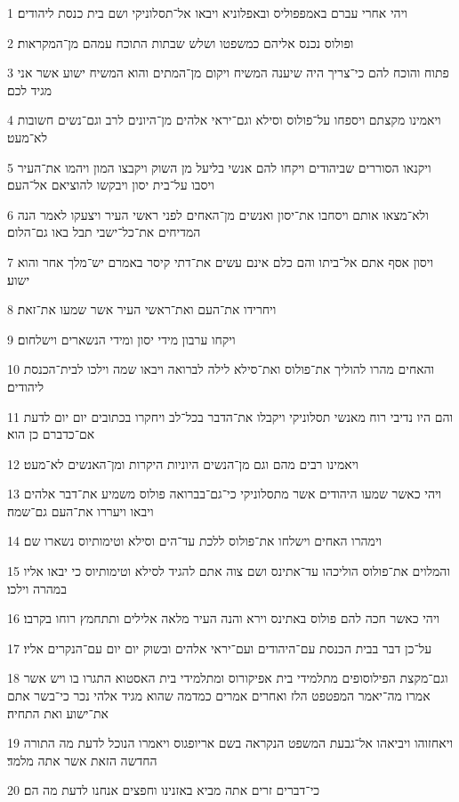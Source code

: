 \par 1 ויהי אחרי עברם באמפפוליס ובאפלוניא ויבאו אל־תסלוניקי ושם בית כנסת ליהודים׃
\par 2 ופולוס נכנס אליהם כמשפטו ושלש שבתות התוכח עמהם מן־המקראות׃
\par 3 פתוח והוכח להם כי־צריך היה שיענה המשיח ויקום מן־המתים והוא המשיח ישוע אשר אני מגיד לכם׃
\par 4 ויאמינו מקצתם ויספחו על־פולוס וסילא וגם־יראי אלהים מן־היונים לרב וגם־נשים חשובות לא־מעט׃
\par 5 ויקנאו הסוררים שביהודים ויקחו להם אנשי בליעל מן השוק ויקבצו המון ויהמו את־העיר ויסבו על־בית יסון ויבקשו להוציאם אל־העם׃
\par 6 ולא־מצאו אותם ויסחבו את־יסון ואנשים מן־האחים לפני ראשי העיר ויצעקו לאמר הנה המדיחים את־כל־ישבי תבל באו גם־הלום׃
\par 7 ויסון אסף אתם אל־ביתו והם כלם אינם עשים את־דתי קיסר באמרם יש־מלך אחר והוא ישוע׃
\par 8 ויחרידו את־העם ואת־ראשי העיר אשר שמעו את־זאת׃
\par 9 ויקחו ערבון מידי יסון ומידי הנשארים וישלחום׃
\par 10 והאחים מהרו להוליך את־פולוס ואת־סילא לילה לברואה ויבאו שמה וילכו לבית־הכנסת ליהודים׃
\par 11 והם היו נדיבי רוח מאנשי תסלוניקי ויקבלו את־הדבר בכל־לב ויחקרו בכתובים יום יום לדעת אם־כדברם כן הוא׃
\par 12 ויאמינו רבים מהם וגם מן־הנשים היוניות היקרות ומן־האנשים לא־מעט׃
\par 13 ויהי כאשר שמעו היהודים אשר מתסלוניקי כי־גם־בברואה פולוס משמיע את־דבר אלהים ויבאו ויעררו את־העם גם־שמה׃
\par 14 וימהרו האחים וישלחו את־פולוס ללכת עד־הים וסילא וטימותיוס נשארו שם׃
\par 15 והמלוים את־פולוס הוליכהו עד־אתינס ושם צוה אתם להגיד לסילא וטימותיוס כי יבאו אליו במהרה וילכו׃
\par 16 ויהי כאשר חכה להם פולוס באתינס וירא והנה העיר מלאה אלילים ותתחמץ רוחו בקרבו׃
\par 17 על־כן דבר בבית הכנסת עם־היהודים ועם־יראי אלהים ובשוק יום יום עם־הנקרים אליו׃
\par 18 וגם־מקצת הפילוסופים מתלמידי בית אפיקורוס ומתלמידי בית האסטוא התגרו בו ויש אשר אמרו מה־יאמר המפטפט הלז ואחרים אמרים כמדמה שהוא מגיד אלהי נכר כי־בשר אתם את־ישוע ואת התחיה׃
\par 19 ויאחזוהו ויביאהו אל־גבעת המשפט הנקראה בשם אריופגוס ויאמרו הנוכל לדעת מה התורה החדשה הזאת אשר אתה מלמד׃
\par 20 כי־דברים זרים אתה מביא באזנינו וחפצים אנחנו לדעת מה הם׃
